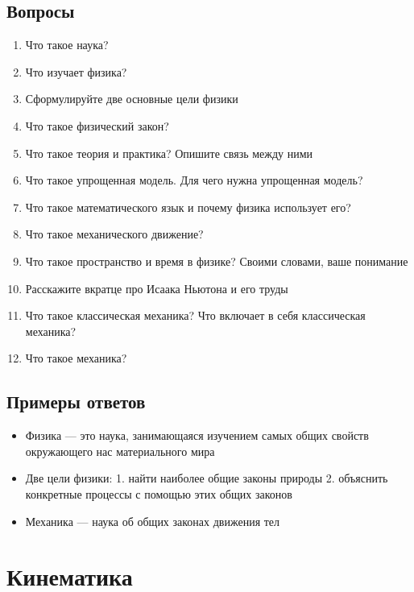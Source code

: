 \documentclass[12pt,a4paper]{report}
\begin{document}
\section{Вопросы}
\begin{enumerate} 
\item Что такое наука? 
\item Что изучает физика? 
\item Сформулируйте две основные цели физики
\item Что такое физический закон? 
\item Что такое теория и практика? Опишите связь между ними
\item Что такое упрощенная модель. Для чего нужна упрощенная модель? 
\item Что такое математического язык и почему физика использует его?
\item Что такое механического движение?
\item Что такое пространство и время в физике? Своими словами, ваше понимание
\item Расскажите вкратце про Исаака Ньютона и его труды
\item Что такое классическая механика? Что включает в себя классическая механика?
\item Что такое механика?
\end{enumerate}

\section{Примеры ответов}
\begin{itemize}
\item Физика --- это наука, занимающаяся изучением самых общих свойств окружающего нас материального мира
\item Две цели физики: 1. найти наиболее общие законы природы 2. объяснить конкретные процессы с помощью этих общих законов
\item Механика --- наука об общих законах движения тел
\end{itemize} 

\chapter{Кинематика}
\end{document}
